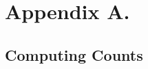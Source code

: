 \section*{Appendix A.}
\label{sec:appendix_a}

\subsection*{Computing Counts}%
\label{sub:app_a_computing_counts}




